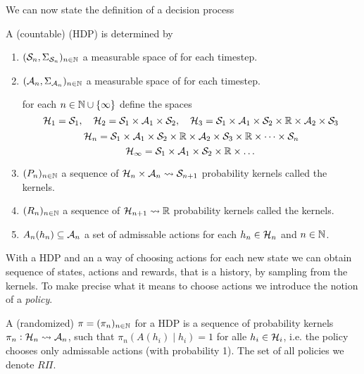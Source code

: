 We can now state the definition of a decision process

\begin{defn}
  A (countable)
   (HDP) is determined by
  \begin{enumerate}
    \item $(\mathcal{S}_n, \Sigma_{\mathcal{S}_n})_{n \in \mathbb{N}}$ a 
      measurable space of  for each timestep.
    \item $(\mathcal{A}_n, \Sigma_{\mathcal{A}_n})_{n \in \mathbb{N}}$ a 
      measurable space of  for each timestep.

      for each $n \in \mathbb{N} \cup \{\infty\}$
      define the  spaces
      \[ \mathcal{H}_1 = \mathcal{S}_1, \quad
	\mathcal{H}_2 = \mathcal{S}_1 \times \mathcal{A}_1\times \mathcal{S}_2,
	\quad \mathcal{H}_3 = \mathcal{S}_1 \times \mathcal{A}_1 \times \mathcal{S}_2 \times
      \mathbb{R} \times \mathcal{A}_2 \times \mathcal{S}_3 \]
      \[ \mathcal{H}_n = \mathcal{S}_1 \times \mathcal{A}_1
	\times \mathcal{S}_2 \times \mathbb{R} \times \mathcal{A}_2
      \times \mathcal{S}_3 \times \mathbb{R} \times \dots \times \mathcal{S}_n \]
      \[
	\mathcal{H}_\infty = \mathcal{S}_1 \times \mathcal{A}_1 \times \mathcal{S}_2 \times
	\mathbb{R} \times \dots
      \]
    \item $(P_n)_{n \in \mathbb{N}}$ a sequence of
      $\mathcal{H}_n \times \mathcal{A}_n \leadsto \mathcal{S}_{n+1}$ probability kernels
      called the  kernels.
    \item $(R_n)_{n \in \mathbb{N}}$ a sequence of
      $\mathcal{H}_{n+1} \leadsto \mathbb{R}$ probability kernels
      called the  kernels.
    \item $A_n(h_n) \subseteq \mathcal{A}_n$ a set of admissable actions
      for each $h_n \in \mathcal{H}_n$ and $n \in \mathbb{N}$.
  \end{enumerate}
  \label{sett:HDP}
\end{defn}

With a HDP and an a way of choosing actions for each new state
we can obtain sequence of states, actions and rewards, that is
a history, by sampling from the kernels.
To make precise what it means to choose actions we introduce the notion
of a \emph{policy}.

\begin{defn}[Policy]
  A (randomized)  $\pi = (\pi_n)_{n \in \mathbb{N}}$ for a
  HDP is a sequence of probability kernels 
  $\pi_n : \mathcal{H}_n \leadsto \mathcal{A}_n$,
  such that $\pi_n(A(h_i) \mid h_i) = 1$ for alle $h_i \in \mathcal{H}_i$,
  i.e. the policy chooses only admissable actions (with probability 1).
  The set of all policies we denote $R\Pi$.
\end{defn}

